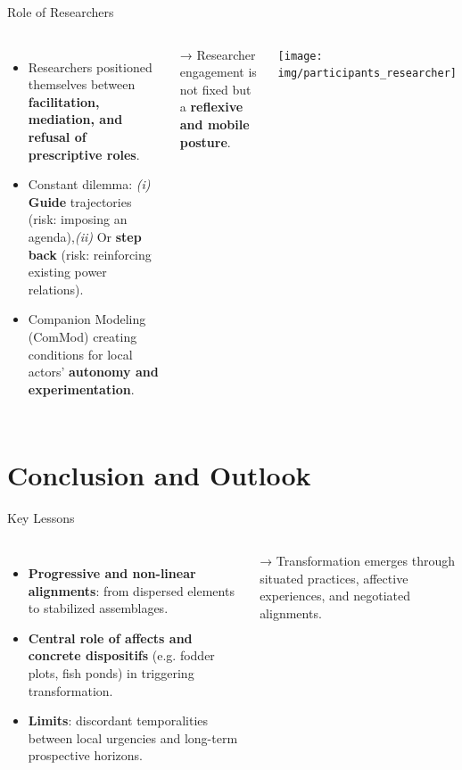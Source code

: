 \documentclass[newPxFont]{beamer}
\begin{document}
\begin{frame}[c]{Role of Researchers}
  \vspace{-0.5cm}
  \begin{columns}[onlytextwidth,T]
    \column{\dimexpr\linewidth-30mm-5mm}

    \begin{itemize}
      \item Researchers positioned themselves between 
            \textbf{facilitation, mediation, and refusal of prescriptive roles}.  
      \item Constant dilemma:  
            \textit{(i)} \textbf{Guide} trajectories (risk: imposing an agenda),\textit{(ii)} Or \textbf{step back} (risk: reinforcing existing power relations).  
      \item Companion Modeling (ComMod) creating conditions for local actors’ \textbf{autonomy and experimentation}.  
    \end{itemize}

    \vspace{0.3cm}
    → Researcher engagement is not fixed but a \textbf{reflexive and mobile posture}.

    \column{30mm}
    
    \texttt{[image: img/participants\_researcher]}
  \end{columns}
\end{frame}

\section{Conclusion and Outlook}

\begin{frame}[c]{Key Lessons}
  \vspace{-0.5cm}
  \begin{columns}[onlytextwidth,T]
    \column{\dimexpr\linewidth-30mm-5mm}

    \begin{itemize}
      \item \textbf{Progressive and non-linear alignments}: from dispersed elements to stabilized assemblages.  
      \item \textbf{Central role of affects and concrete dispositifs} (e.g. fodder plots, fish ponds) in triggering transformation.  
      \item \textbf{Limits}: discordant temporalities between local urgencies and long-term prospective horizons.  
    \end{itemize}

    \vspace{0.3cm}
    → Transformation emerges through situated practices, affective experiences, and negotiated alignments.

    \column{30mm}
    \vspace{1.5cm}
  \end{columns}
\end{frame}
\end{document}
